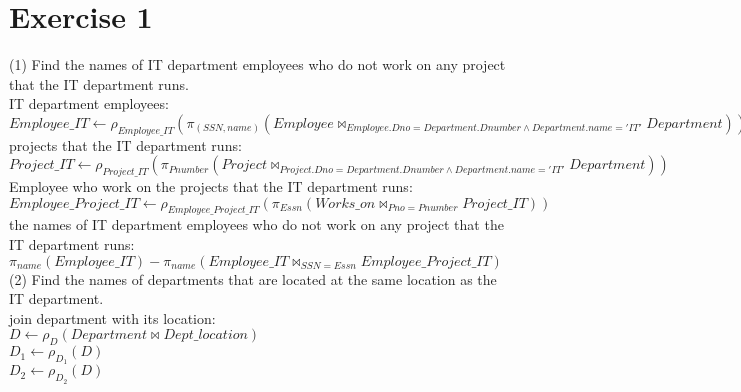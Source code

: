 \documentclass[]{article}
\title{}
\author{}
\date{}
\begin{document}
	
	
	
	\section{Exercise 1}
	
	\noindent(1) Find the names of IT department employees who do not work on any project that the IT department runs.\\

	IT department employees:\\
	
	$Employee\_IT\leftarrow \rho_{Employee\_IT}(\pi_{(SSN,name)}(Employee\bowtie_{Employee.Dno=Department.Dnumber\wedge Department.name='IT'} Department))$
	\\
	
	projects that the IT department runs:\\	

	$Project\_IT\leftarrow \rho_{Project\_IT}(\pi_{Pnumber}(Project\bowtie_{Project.Dno=Department.Dnumber\wedge Department.name='IT'} Department))$\\
	
	Employee who work on the projects that the IT department runs:\\
	
	$Employee\_Project\_IT\leftarrow \rho_{Employee\_Project\_IT}(\pi_{Essn}(Works\_on\bowtie_{Pno=Pnumber} Project\_IT))$\\
	
	the names of IT department employees who do not work on any project that the IT department runs:\\
	
	$\pi_{name}(Employee\_IT)- \pi_{name}(Employee\_IT\bowtie_{SSN=Essn} Employee\_Project\_IT)$\\
	
	\noindent(2) Find the names of departments that are located at the same location as the IT department.\\
	
	join department with its location:\\
	
	$D\leftarrow \rho_{D}(Department\bowtie Dept\_location)$\\
	
	$D_{1}\leftarrow \rho_{D_{1}}(D)$\\
	
	$D_{2}\leftarrow \rho_{D_{2}}(D)$\\
	
\end{document}
